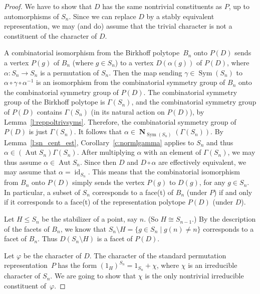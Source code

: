 \documentclass[ALCO,Unicode]{cedram}
\renewcommand{\phi}{\varphi}
\renewcommand{\leq}{\leqslant}
\newcommand{\iso}{\cong}    %
\newcommand{\Sym}[1]{\operatorname{Sym}(#1)}  %
\DeclareMathOperator{\Aut}{Aut}
\DeclareMathOperator{\Norml}{\mathbf{N}}
\DeclareMathOperator{\Id}{id}       %
\begin{document}
\begin{proof}  
  We have to show that $D$ has the same nontrivial constituents
  as $P$, up to automorphisms of $S_n$.
  Since we can replace $D$ by a stably equivalent representation,
  we may (and do) assume that
  the trivial character is not a constituent of the character of $D$.
  
  A combinatorial isomorphism from the Birkhoff polytope~$B_n$
  onto $P(D)$ sends a vertex $P(g)$ of $B_n$ (where $g\in S_n$)
  to a vertex $D(\alpha(g))$ of $P(D)$,
  where $\alpha\colon S_n \to S_n$ is a permutation of $S_n$.
  Then the map sending
  $\gamma\in \Sym{S_n}$ to 
  $\alpha \circ \gamma\circ \alpha^{-1}$
  is an isomorphism from the combinatorial symmetry group of 
  $B_n$ onto the combinatorial symmetry group of $P(D)$.
  The combinatorial symmetry group of the Birkhoff
  polytope is $\Gamma(S_n)$,
  and the combinatorial symmetry group of $P(D)$ contains 
  $\Gamma(S_n)$ (in its natural action on $P(D)$), 
  by Lemma~\ref{l:reppoltrivsyms}.
  Therefore, the combinatorial symmetry group of $P(D)$
  is just $\Gamma(S_n)$.
  It follows that $\alpha \in \Norml_{\Sym{S_n}}(\Gamma(S_n))$.
  By Lemma~\ref{l:sn_cent_est}, Corollary~\ref{c:normlgamma}
  applies to $S_n$ and thus 
  $\alpha\in (\Aut S_n)\Gamma(S_n)$.
  After multiplying $\alpha$ with an element of
  $\Gamma(S_n)$, we may thus assume
  $\alpha \in \Aut S_n$.
  Since then $D$ and $D\circ\alpha$ are effectively equivalent,
  we may assume that $\alpha = \Id_{S_n}$.
  This means that the combinatorial isomorphism from $B_n$ onto $P(D)$
  simply sends the vertex $P(g)$ to $D(g)$, for any $g\in S_n$.
  In particular, a subset of $S_n$ corresponds to a face(t)
  of $B_n$ (under $P$) 
  if and only if it corresponds to a face(t)
  of the representation polytope $P(D)$ (under $D$).
  
  
  
    Let $H \leq S_{n}$ be the stabilizer of a point,
    say $n$. (So $H\iso S_{n-1}$.)
    By the description of the facets of $B_n$, we know that
    $S_n \setminus H = \{g \in S_n\mid g(n)\neq n\}$
    corresponds to a facet of $B_n$.
    Thus $D(S_n\setminus H)$ is a facet of $P(D)$.
      
    Let $\phi$ be the character of $D$.
    The character of the standard permutation representation~$P$
    has the form  $(1_H)^{S_n} = 1_{S_n} + \chi$,
    where $\chi$ is an irreducible character of $S_n$.
    We are going to show that $\chi$ is the only 
    nontrivial irreducible constituent of~$\phi$.
    

\end{proof}
\end{document}
